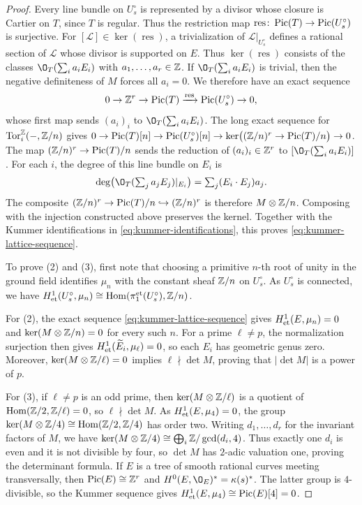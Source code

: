 \begin{proof}
Every line bundle on $U_s^\circ$ is represented by a divisor whose closure is Cartier on $T$, since $T$ is regular.
Thus the restriction map $\operatorname{res}\colon\operatorname{Pic}(T)\to\operatorname{Pic}(U_s^\circ)$ is surjective.
For $[\mathcal L]\in\ker(\operatorname{res})$, a trivialization of $\mathcal L|_{U_s^\circ}$ defines a rational section of $\mathcal L$ whose divisor is supported on $E$.
Thus $\ker(\operatorname{res})$ consists of the classes $\O_T(\sum_i a_iE_i)$ with $a_1,\ldots,a_r\in\mathbb{Z}$.
If $\O_T(\sum_i a_iE_i)$ is trivial, then the negative definiteness of $M$ forces all $a_i = 0$.
We therefore have an exact sequence
\[
  0\to\mathbb{Z}^r\to\operatorname{Pic}(T)\xrightarrow{\operatorname{res}}\operatorname{Pic}(U_s^\circ)\to 0,
\]
whose first map sends $(a_i)_i$ to $\O_T(\sum_i a_iE_i)$.
The long exact sequence for $\operatorname{Tor}^{\mathbb{Z}}_i(-,\mathbb{Z}/n)$ gives $0\to\operatorname{Pic}(T)[n]\to\operatorname{Pic}(U_s^\circ)[n]\to\ker\bigl((\mathbb{Z}/n)^r\to\operatorname{Pic}(T)/n\bigr)\to 0$.
The map $(\mathbb{Z}/n)^r\to\operatorname{Pic}(T)/n$ sends the reduction of $(a_i)_i\in\mathbb{Z}^r$ to $[\O_T(\sum_i a_iE_i)]$.
For each $i$, the degree of this line bundle on $E_i$ is
\[
  \deg\bigl(\O_T(\textstyle\sum_j a_jE_j)|_{E_i}\bigr)
  = \sum_j(E_i\cdot E_j)a_j.
\]
The composite $(\mathbb{Z}/n)^r\to\operatorname{Pic}(T)/n\hookrightarrow(\mathbb{Z}/n)^r$ is therefore $M\otimes\mathbb{Z}/n$.
Composing with the injection constructed above preserves the kernel.
Together with the Kummer identifications in \eqref{eq:kummer-identifications}, this proves \eqref{eq:kummer-lattice-sequence}.

To prove \textup{(2)} and \textup{(3)}, first note that choosing a primitive $n$-th root of unity in the ground field identifies $\mu_n$ with the constant sheaf $\mathbb{Z}/n$ on $U_s^\circ$.
As $U_s^\circ$ is connected, we have $H^1_{\rm et}(U_s^\circ,\mu_n)\cong\operatorname{Hom}(\pi_1^{\rm et}(U_s^\circ),\mathbb{Z}/n)$.

For \textup{(2)}, the exact sequence \eqref{eq:kummer-lattice-sequence} gives $H^1_{\rm et}(E,\mu_n) = 0$ and $\ker(M\otimes\mathbb{Z}/n) = 0$ for every such $n$.
For a prime $\ell\neq p$, the normalization surjection then gives $H^1_{\rm et}(\widetilde E_i,\mu_\ell) = 0$, so each $E_i$ has geometric genus zero.
Moreover, $\ker(M\otimes\mathbb{Z}/\ell) = 0$ implies $\ell\nmid\det M$, proving that $\lvert\det M\rvert$ is a power of $p$.

For \textup{(3)}, if $\ell\neq p$ is an odd prime, then $\ker(M\otimes\mathbb{Z}/\ell)$ is a quotient of $\operatorname{Hom}(\mathbb{Z}/2,\mathbb{Z}/\ell) = 0$, so $\ell\nmid\det M$.
As $H^1_{\rm et}(E,\mu_4) = 0$, the group $\ker(M\otimes\mathbb{Z}/4)\cong\operatorname{Hom}(\mathbb{Z}/2,\mathbb{Z}/4)$ has order two.
Writing $d_1,\dots,d_r$ for the invariant factors of $M$, we have $\ker(M\otimes\mathbb{Z}/4)\cong\bigoplus_i\mathbb{Z}/\gcd(d_i,4)$.
Thus exactly one $d_i$ is even and it is not divisible by four, so $\det M$ has $2$-adic valuation one, proving the determinant formula.
If $E$ is a tree of smooth rational curves meeting transversally, then $\operatorname{Pic}(E)\cong\mathbb{Z}^r$ and $H^0(E,\O_E)^* = \kappa(s)^*$.
The latter group is $4$-divisible, so the Kummer sequence gives $H^1_{\rm et}(E,\mu_4)\cong\operatorname{Pic}(E)[4] = 0$.
\end{proof}

